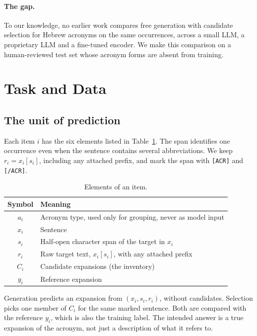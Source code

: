 \documentclass[11pt]{article}
\begin{document}
\paragraph{The gap.}
To our knowledge, no earlier work compares free generation with candidate selection for Hebrew acronyms on the same occurrences, across a small LLM, a proprietary LLM and a fine-tuned encoder. We make this comparison on a human-reviewed test set whose acronym forms are absent from training.

\section{Task and Data}
\label{sec:data}
\subsection{The unit of prediction}
Each item $i$ has the six elements listed in Table~\ref{tab:notation}. The span identifies one occurrence even when the sentence contains several abbreviations. We keep $r_i=x_i[s_i]$, including any attached prefix, and mark the span with \texttt{[ACR]} and \texttt{[/ACR]}.

\begin{table}[!htbp]
\centering\small
\begin{tabular}{@{}cp{}@{}}
\toprule
Symbol & Meaning \\
\midrule
$a_i$ & Acronym type, used only for grouping, never as model input \\
$x_i$ & Sentence \\
$s_i$ & Half-open character span of the target in $x_i$ \\
$r_i$ & Raw target text, $x_i[s_i]$, with any attached prefix \\
$C_i$ & Candidate expansions (the inventory) \\
$y_i$ & Reference expansion \\
\bottomrule
\end{tabular}
\caption{Elements of an item.}
\label{tab:notation}
\end{table}

Generation predicts an expansion from $(x_i,s_i,r_i)$, without candidates. Selection picks one member of $C_i$ for the same marked sentence. Both are compared with the reference $y_i$, which is also the training label. The intended answer is a true expansion of the acronym, not just a description of what it refers to.
\end{document}
